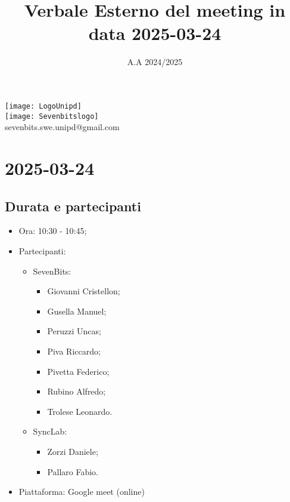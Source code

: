 \documentclass[10pt]{article}
\title{Verbale Esterno del meeting in data 2025-03-24} %
\date{A.A 2024/2025}
\begin{document}
\maketitle
\center 
\texttt{[image: LogoUnipd]}\\
\texttt{[image: Sevenbitslogo]}\\
sevenbits.swe.unipd@gmail.com\\
\vspace{2mm}

\newpage
\raggedright
\tableofcontents

\newpage
\section{2025-03-24} %
\subsection{Durata e partecipanti}
\begin{itemize}
\item Ora: 10:30 - 10:45; %
\item Partecipanti: 	
	\begin{itemize}
            \item SevenBits:
            \begin{itemize}
                \item Giovanni Cristellon;
                \item Gusella Manuel;
                \item Peruzzi Uncas;
                \item Piva Riccardo;
                \item Pivetta Federico;
                \item Rubino Alfredo;
                \item Trolese Leonardo.
	    \end{itemize}
            \item SyncLab:
            \begin{itemize}
                \item Zorzi Daniele;
                \item Pallaro Fabio.
	    \end{itemize}
	\end{itemize}
\item Piattaforma: Google meet (online)
\end{itemize}
\end{document}
